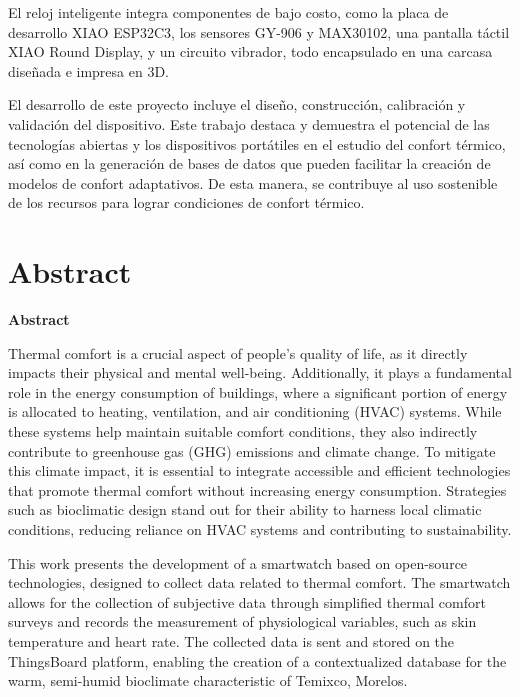 \documentclass[
  12pt,
  letterpaper,
  DIV=11,
  numbers=noendperiod]{scrreport}
\begin{document}
El reloj inteligente integra componentes de bajo costo, como la placa de
desarrollo XIAO ESP32C3, los sensores GY-906 y MAX30102, una pantalla
táctil XIAO Round Display, y un circuito vibrador, todo encapsulado en
una carcasa diseñada e impresa en 3D.

El desarrollo de este proyecto incluye el diseño, construcción,
calibración y validación del dispositivo. Este trabajo destaca y
demuestra el potencial de las tecnologías abiertas y los dispositivos
portátiles en el estudio del confort térmico, así como en la generación
de bases de datos que pueden facilitar la creación de modelos de confort
adaptativos. De esta manera, se contribuye al uso sostenible de los
recursos para lograr condiciones de confort térmico.


\hypertarget{abstract}{%
\chapter*{Abstract}\label{abstract}}


\textbf{Abstract}

Thermal comfort is a crucial aspect of people's quality of life, as it
directly impacts their physical and mental well-being. Additionally, it
plays a fundamental role in the energy consumption of buildings, where a
significant portion of energy is allocated to heating, ventilation, and
air conditioning (HVAC) systems. While these systems help maintain
suitable comfort conditions, they also indirectly contribute to
greenhouse gas (GHG) emissions and climate change. To mitigate this
climate impact, it is essential to integrate accessible and efficient
technologies that promote thermal comfort without increasing energy
consumption. Strategies such as bioclimatic design stand out for their
ability to harness local climatic conditions, reducing reliance on HVAC
systems and contributing to sustainability.

This work presents the development of a smartwatch based on open-source
technologies, designed to collect data related to thermal comfort. The
smartwatch allows for the collection of subjective data through
simplified thermal comfort surveys and records the measurement of
physiological variables, such as skin temperature and heart rate. The
collected data is sent and stored on the ThingsBoard platform, enabling
the creation of a contextualized database for the warm, semi-humid
bioclimate characteristic of Temixco, Morelos.
\end{document}
